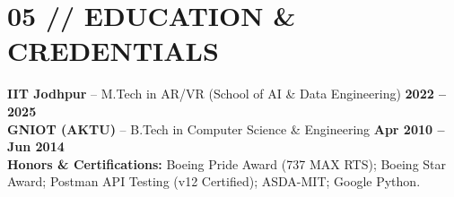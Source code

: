 \documentclass[10pt,a4paper]{article}
\begin{document}
\section*{05 // EDUCATION \& CREDENTIALS}
\small
\noindent
\textbf{IIT Jodhpur} -- M.Tech in AR/VR (School of AI \& Data Engineering) \hfill \textbf{2022 -- 2025}\\[1pt]
\textbf{GNIOT (AKTU)} -- B.Tech in Computer Science \& Engineering \hfill \textbf{Apr 2010 -- Jun 2014}\\[1pt]
\textbf{Honors \& Certifications:} Boeing Pride Award (737 MAX RTS); Boeing Star Award; Postman API Testing (v12 Certified); ASDA-MIT; Google Python.
\end{document}
